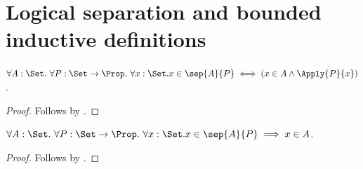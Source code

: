 

\section{Logical separation and bounded inductive definitions}

\begin{proposition}\label{logical_separation_iff}
    $\forall A:\Set.\ \forall P:\Set\to\Prop.\ \forall x:\Set.
        x\in\sep{A}{P}\iff(x\in A\land\Apply{P}{x})$.
\end{proposition}
\begin{proof}
    Follows by .
\end{proof}

\begin{proposition}\label{logical_separation_subseteq}
    $\forall A:\Set.\ \forall P:\Set\to\Prop.\ \forall x:\Set.
        x\in\sep{A}{P}\implies x\in A$.
\end{proposition}
\begin{proof}
    Follows by .
\end{proof}
